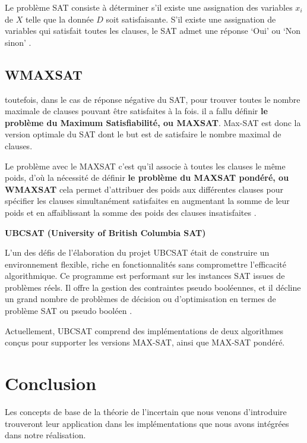 Le problème SAT consiste à déterminer s’il existe une assignation des variables $x_i$ de $X$ telle que la donnée $D$ soit satisfaisante. S’il existe une assignation de variables qui satisfait toutes les clauses, le SAT admet une réponse ‘Oui’ ou ‘Non sinon’ \cite{hkhallafiThesis}.
\subsection{WMAXSAT}

toutefois, dans le cas de réponse négative du SAT, pour trouver toutes le nombre maximale de clauses pouvant être satisfaites à la fois. il a fallu définir \textbf{le problème du Maximum Satisfiabilité, ou MAXSAT}. Max-SAT est donc la version optimale du SAT dont le but est de satisfaire le nombre maximal de clauses.

Le problème avec le MAXSAT c’est qu’il associe à toutes les clauses le même poids, d’où la nécessité de définir \textbf{le problème du MAXSAT pondéré, ou WMAXSAT} cela permet d'attribuer des poids aux différentes clauses pour spécifier les clauses simultanément satisfaites en augmentant la somme de leur poids et en affaiblissant la somme des poids des clauses insatisfaites                      \cite{hkhallafiThesis}.


\textbf{UBCSAT (University of British Columbia SAT)}

L'un des défis de l'élaboration du projet UBCSAT était de construire un environnement flexible, riche en fonctionnalités sans compromettre l'efficacité algorithmique. Ce programme est performant sur les instances SAT issues de problèmes réels. Il offre la gestion des contraintes pseudo booléennes, et il décline un grand nombre de problèmes de décision ou d’optimisation en termes de problème SAT ou pseudo booléen \cite{hassenThesis}.

Actuellement, UBCSAT comprend des implémentations de deux algorithmes conçus pour supporter les versions MAX-SAT, ainsi que MAX-SAT pondéré.

{}
\section*{Conclusion}
Les concepts de base de la théorie de l’incertain que nous venons d'introduire trouveront leur application dans les implémentations que nous avons intégrées dans notre réalisation. 
